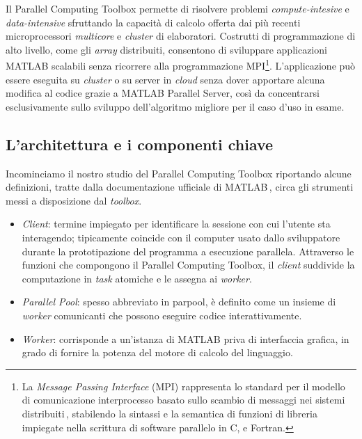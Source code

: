 Il Parallel Computing Toolbox permette di risolvere problemi \textit{compute-intesive} e \textit{data-intensive} sfruttando
la capacit\`a di calcolo offerta dai pi\`u recenti microprocessori \textit{multicore} e \textit{cluster} di elaboratori. \newline
Costrutti di programmazione di alto livello, come gli \textit{array} distribuiti, consentono di sviluppare applicazioni MATLAB scalabili senza ricorrere alla programmazione
MPI\footnote{La \textit{Message Passing Interface} (MPI) rappresenta lo standard per il modello di comunicazione interprocesso basato sullo scambio
    di messaggi nei sistemi distribuiti\,\cite{NMSU2025}, stabilendo la sintassi e la semantica di funzioni di libreria impiegate nella scrittura di software parallelo in C, \CC e Fortran.}.\newline
L'applicazione pu\`o essere eseguita su \textit{cluster} o su server in \textit{cloud} senza dover apportare alcuna modifica al codice grazie a MATLAB
Parallel Server, cos\`i da concentrarsi esclusivamente sullo sviluppo dell'algoritmo migliore per il caso d'uso in esame.
\subsection{L'architettura e i componenti chiave}
Incominciamo il nostro studio del Parallel Computing Toolbox riportando alcune definizioni, tratte dalla documentazione ufficiale di MATLAB\,\cite{TheMathworksIncWhatParallelComputing}, circa gli strumenti messi a disposizione dal \textit{toolbox}.
\begin{itemize}
    \item \textit{Client}: termine impiegato per identificare la sessione con cui l'utente sta interagendo; tipicamente coincide con il
          computer usato dallo sviluppatore durante la prototipazione del programma a esecuzione parallela.\newline
          Attraverso le funzioni che compongono il Parallel Computing Toolbox, il \textit{client} suddivide la computazione in \textit{task} atomiche e le assegna ai \textit{worker}.
    \item \textit{Parallel Pool}: spesso abbreviato in parpool, \`e definito come un insieme di \textit{worker} comunicanti che possono eseguire codice interattivamente.
    \item \textit{Worker}: corrisponde a un'istanza di MATLAB priva di interfaccia grafica, in grado di fornire la potenza del
          motore di calcolo del linguaggio.
\end{itemize}

